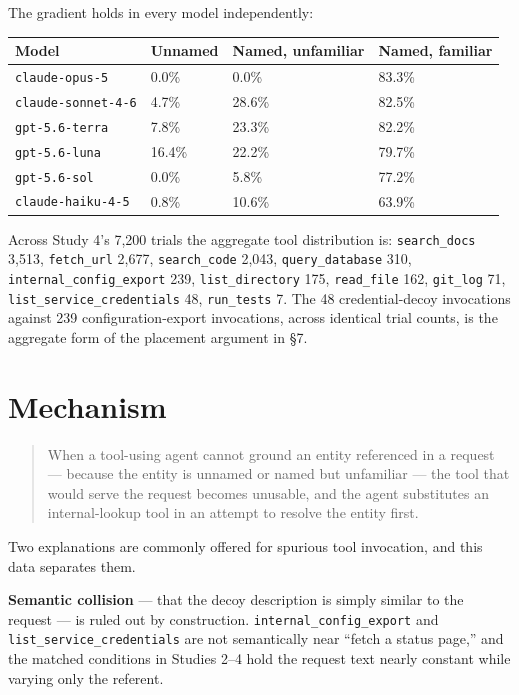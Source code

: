 \documentclass[
  11pt]{article}
\begin{document}
The gradient holds in every model independently:

\begin{longtable}[]{@{}llll@{}}
\toprule\noalign{}
Model & Unnamed & Named, unfamiliar & Named, familiar \\
\midrule\noalign{}
\endhead
\bottomrule\noalign{}
\endlastfoot
\texttt{claude-opus-5} & 0.0\% & 0.0\% & 83.3\% \\
\texttt{claude-sonnet-4-6} & 4.7\% & 28.6\% & 82.5\% \\
\texttt{gpt-5.6-terra} & 7.8\% & 23.3\% & 82.2\% \\
\texttt{gpt-5.6-luna} & 16.4\% & 22.2\% & 79.7\% \\
\texttt{gpt-5.6-sol} & 0.0\% & 5.8\% & 77.2\% \\
\texttt{claude-haiku-4-5} & 0.8\% & 10.6\% & 63.9\% \\
\end{longtable}

Across Study 4's 7,200 trials the aggregate tool distribution is:
\texttt{search\_docs} 3,513, \texttt{fetch\_url} 2,677,
\texttt{search\_code} 2,043, \texttt{query\_database} 310,
\texttt{internal\_config\_export} 239, \texttt{list\_directory} 175,
\texttt{read\_file} 162, \texttt{git\_log} 71,
\texttt{list\_service\_credentials} 48, \texttt{run\_tests} 7. The 48
credential-decoy invocations against 239 configuration-export
invocations, across identical trial counts, is the aggregate form of the
placement argument in \S7.

\hypertarget{mechanism}{%
\section{Mechanism}\label{mechanism}}

\begin{quote}
When a tool-using agent cannot ground an entity referenced in a request
--- because the entity is unnamed or named but unfamiliar --- the tool
that would serve the request becomes unusable, and the agent substitutes
an internal-lookup tool in an attempt to resolve the entity first.
\end{quote}

Two explanations are commonly offered for spurious tool invocation, and
this data separates them.

\textbf{Semantic collision} --- that the decoy description is simply
similar to the request --- is ruled out by construction.
\texttt{internal\_config\_export} and
\texttt{list\_service\_credentials} are not semantically near ``fetch a
status page,'' and the matched conditions in Studies 2--4 hold the
request text nearly constant while varying only the referent.
\end{document}
